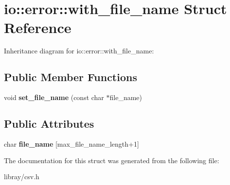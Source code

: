 \hypertarget{structio_1_1error_1_1with__file__name}{}\section{io\+:\+:error\+:\+:with\+\_\+file\+\_\+name Struct Reference}
\label{structio_1_1error_1_1with__file__name}


Inheritance diagram for io\+:\+:error\+:\+:with\+\_\+file\+\_\+name\+:
\subsection*{Public Member Functions}
\begin{DoxyCompactItemize}
\item 
\mbox{\label{structio_1_1error_1_1with__file__name_ae765de62778c989d4658b4efe2995390}} 
void {\bfseries set\+\_\+file\+\_\+name} (const char $\ast$file\+\_\+name)
\end{DoxyCompactItemize}
\subsection*{Public Attributes}
\begin{DoxyCompactItemize}
\item 
\mbox{\label{structio_1_1error_1_1with__file__name_ac957d5590a8b95517b74eb5bf373a424}} 
char {\bfseries file\+\_\+name} \mbox{[}max\+\_\+file\+\_\+name\+\_\+length+1\mbox{]}
\end{DoxyCompactItemize}


The documentation for this struct was generated from the following file\+:\begin{DoxyCompactItemize}
\item 
libray/csv.\+h\end{DoxyCompactItemize}
